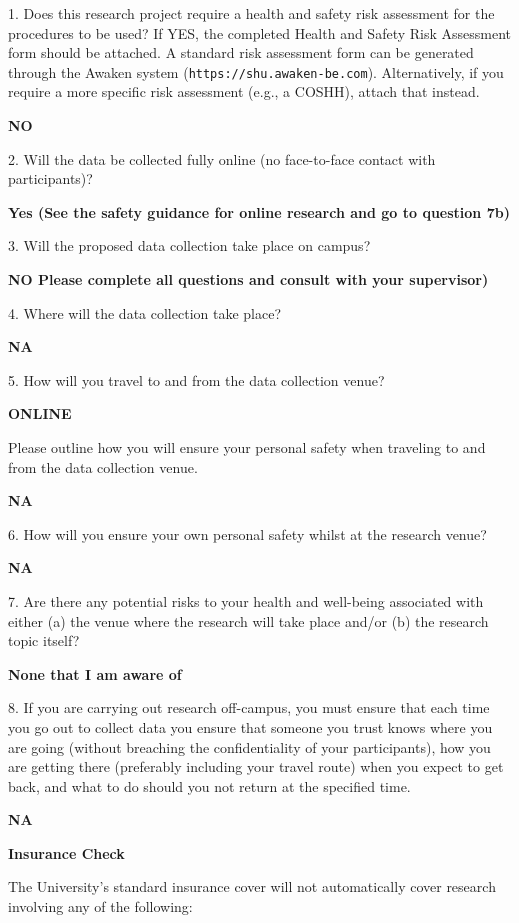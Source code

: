 \documentclass{article}
\begin{document}
1. Does this research project require a health and safety risk assessment for the procedures to be used? If YES, the completed Health and Safety Risk Assessment form should be attached. A standard risk assessment form can be generated through the Awaken system (\texttt{https://shu.awaken-be.com}). Alternatively, if you require a more specific risk assessment (e.g., a COSHH), attach that instead. 

\textbf{NO}

2. Will the data be collected fully online (no face-to-face contact with participants)? 

\textbf{Yes (See the safety guidance for online research and go to question 7b)}

3. Will the proposed data collection take place on campus? 

\textbf{NO Please complete all questions and consult with your supervisor)}

4. Where will the data collection take place? 

\textbf{NA}

5. How will you travel to and from the data collection venue? 

\textbf{ONLINE}

Please outline how you will ensure your personal safety when traveling to and from the data collection venue. 

\textbf{NA}

6. How will you ensure your own personal safety whilst at the research venue? 

\textbf{NA}

7. Are there any potential risks to your health and well-being associated with either (a) the venue where the research will take place and/or (b) the research topic itself? 

\textbf{None that I am aware of}

8. If you are carrying out research off-campus, you must ensure that each time you go out to collect data you ensure that someone you trust knows where you are going (without breaching the confidentiality of your participants), how you are getting there (preferably including your travel route) when you expect to get back, and what to do should you not return at the specified time. 

\textbf{NA}

\newpage

\textbf{Insurance Check}

The University’s standard insurance cover will not automatically cover research involving any of the following:
\end{document}
